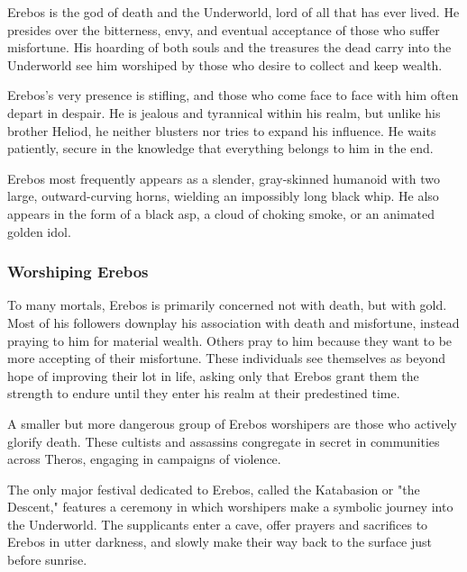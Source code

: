     Erebos is the god of death and the Underworld, lord of all that has ever lived. He presides over the bitterness, envy, and eventual acceptance of those who suffer misfortune. His hoarding of both souls and the treasures the dead carry into the Underworld see him worshiped by those who desire to collect and keep wealth.

    Erebos's very presence is stifling, and those who come face to face with him often depart in despair. He is jealous and tyrannical within his realm, but unlike his brother Heliod, he neither blusters nor tries to expand his influence. He waits patiently, secure in the knowledge that everything belongs to him in the end.

    Erebos most frequently appears as a slender, gray-skinned humanoid with two large, outward-curving horns, wielding an impossibly long black whip. He also appears in the form of a black asp, a cloud of choking smoke, or an animated golden idol.

    \subsubsection{Worshiping Erebos}
        To many mortals, Erebos is primarily concerned not with death, but with gold. Most of his followers downplay his association with death and misfortune, instead praying to him for material wealth. Others pray to him because they want to be more accepting of their misfortune. These individuals see themselves as beyond hope of improving their lot in life, asking only that Erebos grant them the strength to endure until they enter his realm at their predestined time.

        A smaller but more dangerous group of Erebos worshipers are those who actively glorify death. These cultists and assassins congregate in secret in communities across Theros, engaging in campaigns of violence.

        The only major festival dedicated to Erebos, called the Katabasion or "the Descent," features a ceremony in which worshipers make a symbolic journey into the Underworld. The supplicants enter a cave, offer prayers and sacrifices to Erebos in utter darkness, and slowly make their way back to the surface just before sunrise.
